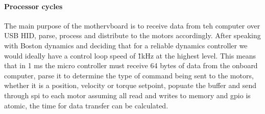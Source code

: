    		\paragraph{Processor cycles}
   			The main purpose of the mothervboard is to receive data from teh computer over USB HID, parse, process and distribute to the motors accordingly. After speaking with Boston dynamics and deciding that for a reliable dynamics controller we would ideally have a control loop speed of \~ 1kHz at the highest level. This means that in 1 ms the micro controller must receive 64 bytes of data from the onboard computer, parse it to determine the type of command being sent to the motors, whether it is a position, velocity or torque setpoint, popuate the buffer and send through spi to each motor assuming all read and writes to memory and gpio is atomic, the time for data transfer can be calculated. \newline
     			
